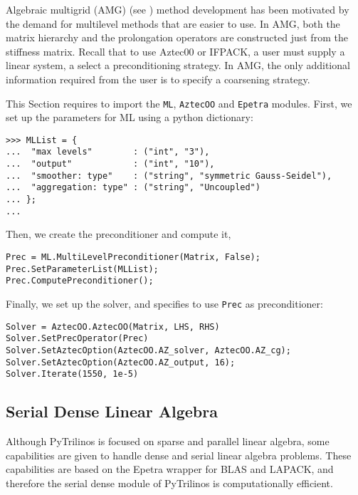 \documentclass[10pt,relax]{SANDreport}
\begin{document}
Algebraic multigrid (AMG)  (see \cite[Section 8]{Briggs2000}) method
development has been motivated by the demand for multilevel methods that are
easier to use.  In AMG, both the matrix hierarchy and the prolongation
operators are constructed just from the stiffness matrix.  Recall that to use
Aztec00 or IFPACK,  a user must supply a linear system, a select a
preconditioning strategy.  In AMG, the only additional information required
from the user is to specify a coarsening strategy.

This Section requires to import the {\tt ML}, {\tt AztecOO} and {\tt Epetra}
modules. First, we set up the parameters for ML using a python dictionary:
\begin{verbatim}
>>> MLList = {
...  "max levels"        : ("int", "3"),
...  "output"            : ("int", "10"),
...  "smoother: type"    : ("string", "symmetric Gauss-Seidel"),
...  "aggregation: type" : ("string", "Uncoupled")
... };
... 
\end{verbatim}
Then, we create the preconditioner and compute it,
\begin{verbatim}
Prec = ML.MultiLevelPreconditioner(Matrix, False);
Prec.SetParameterList(MLList);
Prec.ComputePreconditioner();
\end{verbatim}
Finally, we set up the solver, and specifies to use \verb!Prec! as
preconditioner:
\begin{verbatim}
Solver = AztecOO.AztecOO(Matrix, LHS, RHS)
Solver.SetPrecOperator(Prec)
Solver.SetAztecOption(AztecOO.AZ_solver, AztecOO.AZ_cg);
Solver.SetAztecOption(AztecOO.AZ_output, 16);
Solver.Iterate(1550, 1e-5)
\end{verbatim}

\subsection{Serial Dense Linear Algebra}
\label{sec:serialdense}

Although PyTrilinos is focused on sparse and parallel linear algebra, some
capabilities are given to handle dense and serial linear algebra problems.
These capabilities are based on the Epetra wrapper for BLAS and LAPACK, and
therefore the serial dense module of PyTrilinos is computationally efficient.
\end{document}
